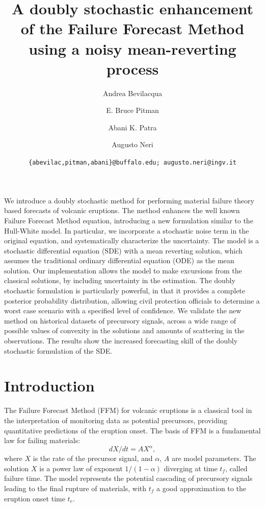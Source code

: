 \documentclass{article}
\begin{document}
\title{\bf A doubly stochastic enhancement of the Failure Forecast Method using a noisy mean-reverting process}
\author[1]{Andrea Bevilacqua}
\author[2]{E. Bruce Pitman}
\author[3,4]{Abani K. Patra}
\author[5]{Augusto Neri}


\date{\texttt{\{abevilac,pitman,abani\}@buffalo.edu; augusto.neri@ingv.it}}


\maketitle
\abstract
We introduce a doubly stochastic method for performing material failure theory based forecasts of volcanic eruptions. The method enhances the well known Failure Forecast Method equation, introducing a new formulation similar to the Hull-White model. In particular, we incorporate a stochastic noise term in the original equation, and systematically characterize the uncertainty. The model is a stochastic differential equation (SDE) with a mean reverting solution, which assumes the traditional ordinary differential equation (ODE) as the mean solution. Our implementation allows the model to make excursions from the classical solutions, by including uncertainty in the estimation. The doubly stochastic formulation is particularly powerful, in that it provides a complete posterior probability distribution, allowing civil protection officials to determine a worst case scenario with a specified level of confidence. We validate the new method on historical datasets of precursory signals, across a wide range of possible values of convexity in the solutions and amounts of scattering in the observations. The results show the increased forecasting skill of the doubly stochastic formulation of the SDE.

\tableofcontents

\section{Introduction}
The Failure Forecast Method (FFM) for volcanic eruptions is a classical tool in the interpretation of monitoring data as potential precursors, providing quantitative predictions of the eruption onset. The basis of FFM is a fundamental law for failing materials:
$$dX/dt=AX^\alpha,$$
where $X$ is the rate of the precursor signal, and $\alpha$, $A$ are model parameters. The solution $X$ is a power law of exponent $1/(1-\alpha)$ diverging at time $t_f$, called failure time. The model represents the potential cascading of precursory signals leading to the final rupture of materials, with $t_f$ a good approximation to the eruption onset time $t_e$.
\end{document}
